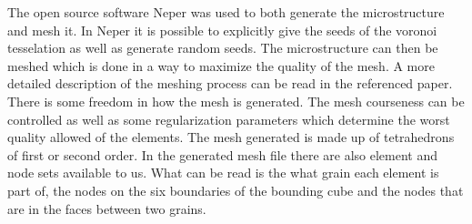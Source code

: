 \documentclass[micro_gen.tex]{subfiles}
\begin{document}
The open source software Neper \cite{neper} was used to both generate the microstructure and mesh it. In Neper it is possible to explicitly give the seeds of the voronoi tesselation as well as generate random seeds. The microstructure can then be meshed which is done in a way to maximize the quality of the mesh. A more detailed description of the meshing process can be read in the referenced paper. There is some freedom in how the mesh is generated. The mesh courseness can be controlled as well as some regularization parameters which determine the worst quality allowed of the elements. The mesh generated is made up of tetrahedrons of first or second order. In the generated mesh file there are also element and node sets available to us. What can be read is the what grain each element is part of, the nodes on the six boundaries of the bounding cube and the nodes that are in the faces between two grains.
\end{document}
